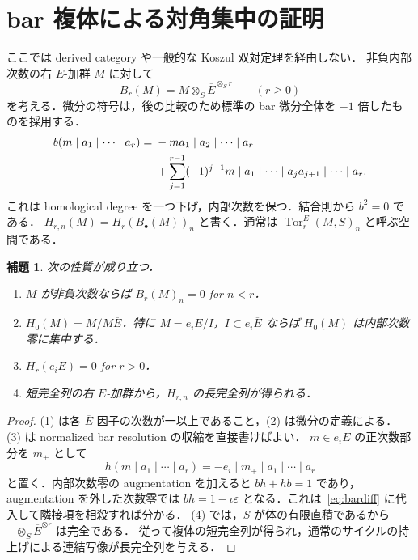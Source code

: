 \documentclass[a4paper,11pt]{ltjsarticle}
\newtheorem{lemma}[theorem]{補題}
\theoremstyle{definition}
\DeclareMathOperator{\Tor}{Tor}
\newcommand{\barE}{\overline E}
\begin{document}
\section{bar 複体による対角集中の証明}
ここでは derived category や一般的な Koszul 双対定理を経由しない．
非負内部次数の右 $E$-加群 $M$ に対して
\[
 B_r(M)=M\otimes_S\barE^{\otimes_S r}\qquad(r\geq0)
\]
を考える．微分の符号は，後の比較のため標準の bar 微分全体を $-1$ 倍したものを採用する．
\begin{align}\label{eq:bardiff}
 b(m\mid a_1\mid\cdots\mid a_r)
 ={}&-ma_1\mid a_2\mid\cdots\mid a_r\notag\\
 &+\sum_{j=1}^{r-1}(-1)^{j-1}
 m\mid a_1\mid\cdots\mid a_ja_{j+1}\mid\cdots\mid a_r.
\end{align}
これは homological degree を一つ下げ，内部次数を保つ．結合則から $b^2=0$ である．
$H_{r,n}(M)=H_r(B_\bullet(M))_n$ と書く．通常は $\Tor^E_r(M,S)_n$ と呼ぶ空間である．

\begin{lemma}\label{lem:barbasic}
次の性質が成り立つ．
\begin{enumerate}
\item $M$ が非負次数ならば $B_r(M)_n=0$ for $n<r$．
\item $H_0(M)=M/M\barE$．特に $M=e_iE/I$，$I\subset e_i\barE$ ならば
$H_0(M)$ は内部次数零に集中する．
\item $H_r(e_iE)=0$ for $r>0$．
\item 短完全列の右 $E$-加群から，$H_{r,n}$ の長完全列が得られる．
\end{enumerate}
\end{lemma}
\begin{proof}
(1) は各 $\barE$ 因子の次数が一以上であること，(2) は微分の定義による．
(3) は normalized bar resolution の収縮を直接書けばよい．
$m\in e_iE$ の正次数部分を $m_+$ として
\[
 h(m\mid a_1\mid\cdots\mid a_r)
 =-e_i\mid m_+\mid a_1\mid\cdots\mid a_r
\]
と置く．内部次数零の augmentation を加えると
$bh+hb=1$ であり，augmentation を外した次数零では
$bh=1-\iota\varepsilon$ となる．これは~\eqref{eq:bardiff} に代入して隣接項を相殺すれば分かる．
(4) では，$S$ が体の有限直積であるから $-\otimes_S\barE^{\otimes r}$ は完全である．
従って複体の短完全列が得られ，通常のサイクルの持上げによる連結写像が長完全列を与える．
\end{proof}
\end{document}
